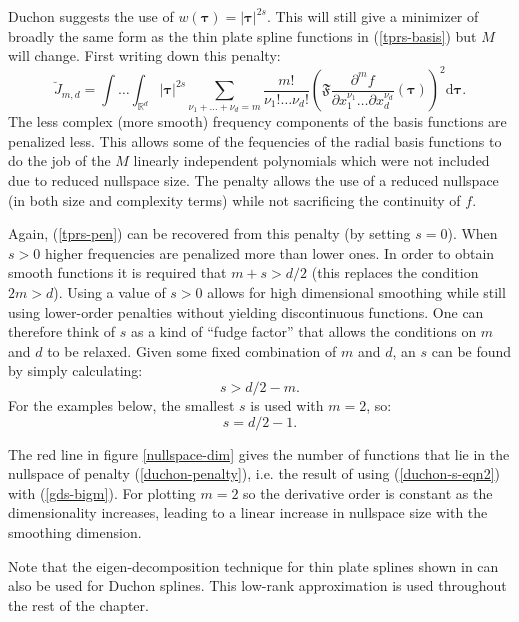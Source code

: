 Duchon suggests the use of $w(\boldsymbol{\tau})= \lvert \boldsymbol{\tau} \rvert^{2s}$. This will still give a minimizer of broadly the same form as the thin plate spline functions in (\ref{tprs-basis}) but $M$ will change. First writing down this penalty:
\begin{equation}
\breve{J}_{m,d} = \int \ldots \int_{\mathbb{R}^d} \lvert \boldsymbol{\tau} \rvert^{2s} \sum_{\nu_1 + \dots + \nu_d=m} \frac{m!}{\nu_1! \dots \nu_d!}\left ( \mathfrak{F} \frac{\partial^m f}{\partial x_1^{\nu_1} \ldots  \partial x_d^{\nu_d}} \left (\boldsymbol{\tau} \right ) \right )^2 \text{d} \boldsymbol{\tau}.
\label{duchon-penalty}
\end{equation}
The less complex (more smooth) frequency components of the basis functions are penalized less. This allows some of the fequencies of  the radial basis functions to do the job of the $M$ linearly independent polynomials which were not included due to reduced nullspace size. The penalty allows the use of a reduced nullspace (in both size and complexity terms) while not sacrificing the continuity of $f$. 

Again, (\ref{tprs-pen}) can be recovered from this penalty (by setting $s=0$). When $s>0$ higher frequencies are penalized more than lower ones. In order to obtain smooth functions it is required that $m+s>d/2$ (this replaces the condition $2m>d$). Using a value of $s>0$ allows for high dimensional smoothing while still using lower-order penalties without yielding discontinuous functions. One can therefore think of $s$ as a kind of ``fudge factor'' that allows the conditions on $m$ and $d$ to be relaxed. Given some fixed combination of $m$ and $d$, an $s$ can be found by simply calculating:
\begin{equation}
s>d/2-m.
\label{duchon-s-eqn}
\end{equation}
For the examples below, the smallest $s$ is used with $m=2$, so:
\begin{equation}
s=d/2-1.
\label{duchon-s-eqn2}
\end{equation}

The red line in figure \ref{nullspace-dim} gives the number of functions that lie in the nullspace of penalty (\ref{duchon-penalty}), i.e. the result of using (\ref{duchon-s-eqn2}) with (\ref{gds-bigm}). For plotting $m=2$ so the derivative order is constant as the dimensionality increases, leading to a linear increase in nullspace size with the smoothing dimension.

Note that the eigen-decomposition technique for thin plate splines shown in  can also be used for Duchon splines. This low-rank approximation is used throughout the rest of the chapter.

